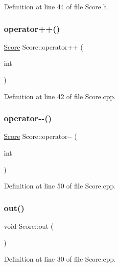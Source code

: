 Definition at line 44 of file Score.\+h.

\hypertarget{class_score_a9c8f64c49d6b45e12a8dd7b69cc190e0}{}\label{class_score_a9c8f64c49d6b45e12a8dd7b69cc190e0} 
\subsubsection{\texorpdfstring{operator++()}{operator++()}}
{\footnotesize\ttfamily \hyperlink{class_score}{Score} Score\+::operator++ (\begin{DoxyParamCaption}\item[{int}]{ }\end{DoxyParamCaption})}



Definition at line 42 of file Score.\+cpp.

\hypertarget{class_score_a03396e0deb4f20bcef0e815cf3a38971}{}\label{class_score_a03396e0deb4f20bcef0e815cf3a38971} 
\subsubsection{\texorpdfstring{operator-\/-\/()}{operator--()}}
{\footnotesize\ttfamily \hyperlink{class_score}{Score} Score\+::operator-\/-\/ (\begin{DoxyParamCaption}\item[{int}]{ }\end{DoxyParamCaption})}



Definition at line 50 of file Score.\+cpp.

\hypertarget{class_score_a125441f8712f915c509ad687433f3219}{}\label{class_score_a125441f8712f915c509ad687433f3219} 
\subsubsection{\texorpdfstring{out()}{out()}}
{\footnotesize\ttfamily void Score\+::out (\begin{DoxyParamCaption}{ }\end{DoxyParamCaption})}



Definition at line 30 of file Score.\+cpp.

\hypertarget{class_score_ac075ef8fa25c2c5d63137dc44162d000}{}\label{class_score_ac075ef8fa25c2c5d63137dc44162d000} 
